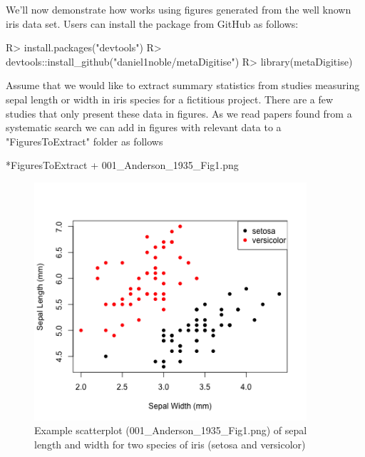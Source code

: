 \documentclass[article]{jss}
\newcommand{\fct}[1]{\code{#1()}}
\begin{document}
We'll now demonstrate how \fct{metaDigitise} works using figures generated from the well known iris data set. Users can install the  package from GitHub as follows:

\begin{CodeChunk}
\begin{CodeInput}
R> install.packages("devtools")
R> devtools::install_github("daniel1noble/metaDigitise")
R> library(metaDigitise)
\end{CodeInput}
\end{CodeChunk}

Assume that we would like to extract summary statistics from studies measuring sepal length or width in iris species for a fictitious project. There are a few studies that only present these data in figures. As we read papers found from a systematic search we can add in figures with relevant data to a "FiguresToExtract" folder as follows

\begin{CodeChunk}
\begin{CodeOutput}
*FiguresToExtract
    + 001_Anderson_1935_Fig1.png
\end{CodeOutput}
\end{CodeChunk}

\begin{figure}[!h] 
 \includegraphics[width=0.9\textwidth]{001_Anderson_1935_Fig1.png} 
 \caption{Example scatterplot (001\_Anderson\_1935\_Fig1.png) of sepal length and width for two species of iris (setosa and versicolor)}
\label{fig:rotate}
\end{figure}
\end{document}
